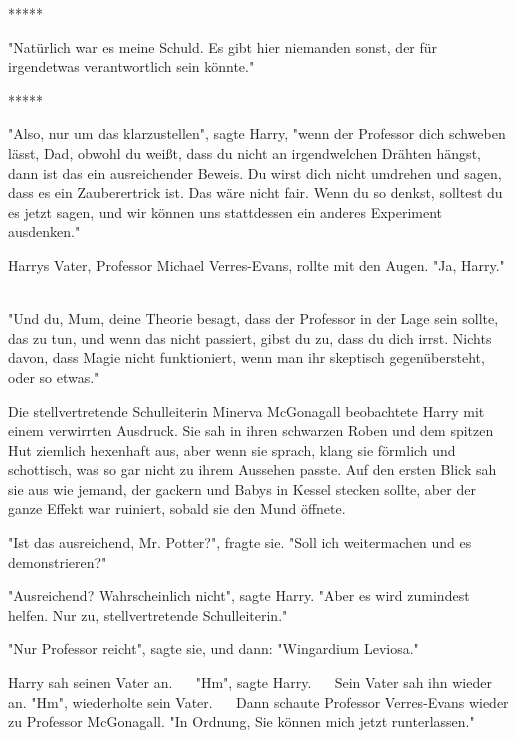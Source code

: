 

\hypertarget{alles-was-ich-glaubte-ist-falsch.}{%

*****

"Natürlich war es meine Schuld. Es gibt hier niemanden sonst, der für irgendetwas verantwortlich sein könnte." ~ ~

*****

"Also, nur um das klarzustellen", sagte Harry, "wenn der Professor dich schweben lässt, Dad, obwohl du weißt, dass du nicht an irgendwelchen Drähten hängst, dann ist das ein ausreichender Beweis. Du wirst dich nicht umdrehen und sagen, dass es ein Zauberertrick ist. Das wäre nicht fair. Wenn du so denkst, solltest du es jetzt sagen, und wir können uns stattdessen ein anderes Experiment ausdenken." ~ ~

Harrys Vater, Professor Michael Verres-Evans, rollte mit den Augen. "Ja, Harry." ~

"Und du, Mum, deine Theorie besagt, dass der Professor in der Lage sein sollte, das zu tun, und wenn das nicht passiert, gibst du zu, dass du dich irrst. Nichts davon, dass Magie nicht funktioniert, wenn man ihr skeptisch gegenübersteht, oder so etwas."

Die stellvertretende Schulleiterin Minerva McGonagall beobachtete Harry mit einem verwirrten Ausdruck. Sie sah in ihren schwarzen Roben und dem spitzen Hut ziemlich hexenhaft aus, aber wenn sie sprach, klang sie förmlich und schottisch, was so gar nicht zu ihrem Aussehen passte. Auf den ersten Blick sah sie aus wie jemand, der gackern und Babys in Kessel stecken sollte, aber der ganze Effekt war ruiniert, sobald sie den Mund öffnete.

"Ist das ausreichend, Mr. Potter?", fragte sie. "Soll ich weitermachen und es demonstrieren?" ~ ~

"Ausreichend? Wahrscheinlich nicht", sagte Harry. "Aber es wird zumindest helfen. Nur zu, stellvertretende Schulleiterin."

"Nur Professor reicht", sagte sie, und dann: "Wingardium Leviosa." ~ ~

Harry sah seinen Vater an. ~ ~"Hm", sagte Harry. ~ ~Sein Vater sah ihn wieder an. "Hm", wiederholte sein Vater. ~ ~Dann schaute Professor Verres-Evans wieder zu Professor McGonagall. "In Ordnung, Sie können mich jetzt runterlassen." ~ ~

}
